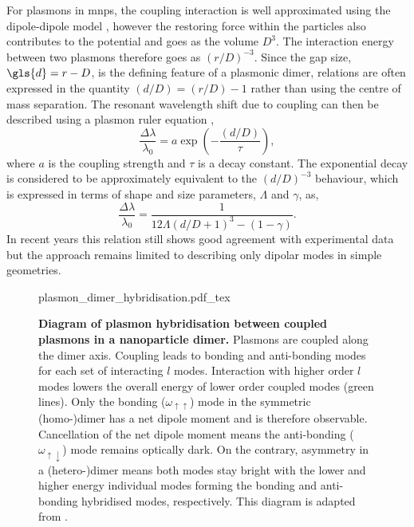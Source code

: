 \documentclass{article}
\begin{document}
For plasmons in \glspl{mnp}, the coupling interaction is well approximated using the dipole-dipole model \cite{kreibig1995optical, maier2002, gluodenis2002, rechberger2003, atay2004}, however the restoring force within the particles also contributes to the potential and goes as the volume $D^3$. The interaction energy between two plasmons therefore goes as $(r/D)^{-3}$. Since the gap size, $\gls{d}=r-D$, is the defining feature of a plasmonic dimer, relations are often expressed in the quantity $(d/D) = (r/D)-1$ rather than using the centre of mass separation. The resonant wavelength shift due to coupling can then be described using a plasmon ruler equation \cite{jain2007, ben2011},
\begin{equation}
	\frac{\Delta\lambda}{\lambda_0} = a\exp\left(-\frac{(d/D)}{\tau}\right),
	\label{eq:plasmon_ruler}
\end{equation}
where $a$ is the coupling strength and $\tau$ is a decay constant. The exponential decay is considered to be approximately equivalent to the $(d/D)^{-3}$ behaviour, which is expressed in terms of shape and size parameters, $\Lambda$ and $\gamma$, as,
\begin{equation}
	\frac{\Delta\lambda}{\lambda_0} = \frac{1}{12\Lambda(d/D+1)^3 - (1-\gamma)}.
\end{equation}
In recent years this relation still shows good agreement with experimental data but the approach remains limited to describing only dipolar modes in simple geometries. %

\begin{figure}[bt]
\centering
\fontsize{10pt}{1em}\selectfont
\def\svgwidth{0.98\textwidth}
{plasmon_dimer_hybridisation.pdf_tex}
\caption[Diagram of plasmon hybridisation between coupled plasmons in a nanoparticle dimer]{\textbf{Diagram of plasmon hybridisation between coupled plasmons in a nanoparticle dimer.} Plasmons are coupled along the dimer axis. Coupling leads to bonding and anti-bonding modes for each set of interacting $l$ modes. Interaction with higher order $l$ modes lowers the overall energy of lower order coupled modes (green lines). Only the bonding ($\omega_{\uparrow\uparrow}$) mode in the symmetric (homo-)dimer has a net dipole moment and is therefore observable. Cancellation of the net dipole moment means the anti-bonding ($\omega_{\uparrow\downarrow}$) mode remains optically dark. On the contrary, asymmetry in a (hetero-)dimer means both modes stay bright with the lower and higher energy individual modes forming the bonding and anti-bonding hybridised modes, respectively. This diagram is adapted from \cite{nordlander2004}.}
\label{fig:plasmon_hybridisation}
\end{figure}
\end{document}
